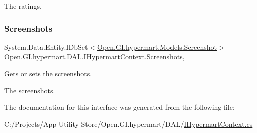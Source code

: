 The ratings. \hypertarget{interface_open_1_1_g_i_1_1hypermart_1_1_d_a_l_1_1_i_hypermart_context_ab60981916a8ecd6e871be2f4cb699b19}{}\label{interface_open_1_1_g_i_1_1hypermart_1_1_d_a_l_1_1_i_hypermart_context_ab60981916a8ecd6e871be2f4cb699b19} 
\subsubsection{\texorpdfstring{Screenshots}{Screenshots}}
{\footnotesize\ttfamily System.\+Data.\+Entity.\+I\+Db\+Set$<$\hyperlink{class_open_1_1_g_i_1_1hypermart_1_1_models_1_1_screenshot}{Open.\+G\+I.\+hypermart.\+Models.\+Screenshot}$>$ Open.\+G\+I.\+hypermart.\+D\+A\+L.\+I\+Hypermart\+Context.\+Screenshots\hspace{0.3cm}{\ttfamily [get]}, {\ttfamily [set]}}



Gets or sets the screenshots. 

The screenshots. 

The documentation for this interface was generated from the following file\+:\begin{DoxyCompactItemize}
\item 
C\+:/\+Projects/\+App-\/\+Utility-\/\+Store/\+Open.\+G\+I.\+hypermart/\+D\+A\+L/\hyperlink{_i_hypermart_context_8cs}{I\+Hypermart\+Context.\+cs}\end{DoxyCompactItemize}
